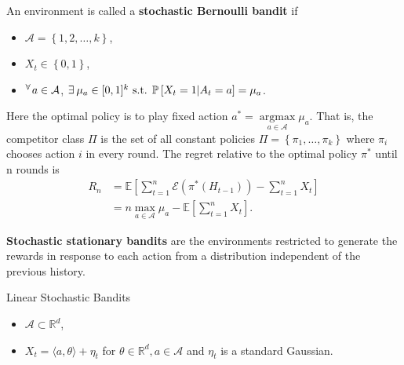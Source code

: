 \documentclass[10pt]{article}
\theoremstyle{definition}
\newenvironment{example*}[1]{%
  \IfBlankTF{#1}
    {\renewcommand{\themanualexampleinner}{\unskip}}
    {\renewcommand\themanualexampleinner{#1}}%
  \manualexampleinner
}{\endmanualexampleinner}
\newenvironment{definition*}[1]{%
  \IfBlankTF{#1}
    {\renewcommand{\themanualdefinitioninner}{\unskip}}
    {\renewcommand\themanualdefinitioninner{#1}}%
  \manualdefinitioninner
}{\endmanualdefinitioninner}
\DeclareMathOperator*{\argmax}{argmax}
\begin{document}
\begin{example*}
    An environment is called a \textbf{stochastic Bernoulli bandit} if 
    \begin{itemize}
        \item $\mathcal{A} = \left \{ 1, 2, \ldots, k \right \}$,
        \item $X_t \in \left\{0, 1 \right\}$,
        \item $^\forall \hspace{0.1em} a \in \mathcal{A}$, $\exists \hspace{0.2em} \mu_a \in [0,1]^k \text{ s.t. } \mathbb{P} \left[ X_t = 1| A_t = a \right] = \mu_a$.
    \end{itemize}
    Here the optimal policy is to play fixed action $a^* = \argmax\limits_{a \in \mathcal{A}} \mu_a$.
    That is, the competitor class $\Pi$ is the set of all constant policies $\Pi = \left \{ \pi_1, \ldots , \pi_k \right \}$ where $\pi_i$ chooses action $i$ in every round.
    The regret relative to the optimal policy $\pi^*$ until n rounds is
    \begin{equation*}
        \begin{aligned}
            R_n &= \mathbb{E}\left[ \sum_{t=1}^{n} \mathcal{E}(\pi^* (H_{t-1})) - \sum_{t=1}^{n} X_t \right] \\
            &= n \max\limits_{a \in \mathcal{A}} \mu_a - \mathbb{E}\left[ \sum_{t=1}^{n} X_t \right].
        \end{aligned}
    \end{equation*}
\end{example*}

\begin{definition*}{}
    \textbf{Stochastic stationary bandits} are the environments restricted to generate the rewards in response to each action from a distribution independent of the previous history.
    \begin{example*}{Linear Stochastic Bandits}
        \leavevmode
        \begin{itemize}
            \item $\mathcal{A} \subset \mathbb{R}^d$,
            \item $X_t = \langle a, \theta \rangle + \eta_t$ for $\theta \in \mathbb{R}^d, a \in \mathcal{A}$ and $\eta_t$ is a standard Gaussian.
        \end{itemize}
    \end{example*}
\end{definition*}

\end{document}
